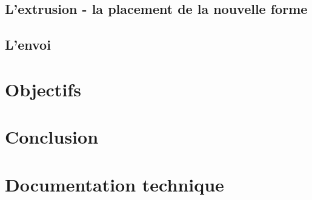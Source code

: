 \documentclass[a4paper,11pt]{article}
\begin{document}
		\subsection{L'extrusion - la placement de la nouvelle forme}
		\subsection{L'envoi}
	\section{Objectifs}
	\section{Conclusion}
	\section{Documentation technique}
	
\end{document}
